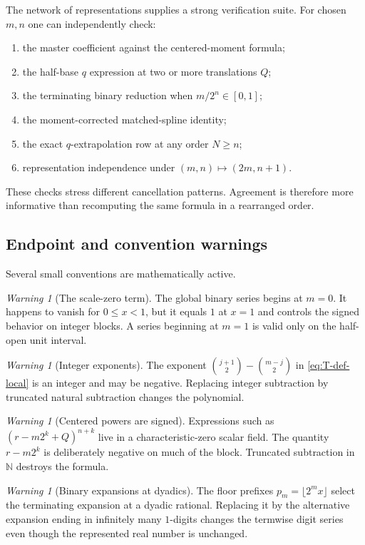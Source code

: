 \documentclass[11pt,oneside]{article}
\theoremstyle{definition}
\theoremstyle{remark}
\newtheorem{warning}[theorem]{Warning}
\newcommand{\N}{\mathbb N}
\begin{document}
The network of representations supplies a strong verification suite.  For chosen $m,n$ one
can independently check:
\begin{enumerate}
\item the master coefficient against the centered-moment formula;
\item the half-base $q$ expression at two or more translations $Q$;
\item the terminating binary reduction when $m/2^n\in[0,1]$;
\item the moment-corrected matched-spline identity;
\item the exact $q$-extrapolation row at any order $N\ge n$;
\item representation independence under $(m,n)\mapsto(2m,n+1)$.
\end{enumerate}
These checks stress different cancellation patterns.  Agreement is therefore more informative
than recomputing the same formula in a rearranged order.

\subsection{Endpoint and convention warnings}

Several small conventions are mathematically active.

\begin{warning}[The scale-zero term]
The global binary series begins at $m=0$.  It happens to vanish for $0\le x<1$, but it equals
$1$ at $x=1$ and controls the signed behavior on integer blocks.  A series beginning at
$m=1$ is valid only on the half-open unit interval.
\end{warning}

\begin{warning}[Integer exponents]
The exponent
$\binom{j+1}{2}-\binom{m-j}{2}$ in \eqref{eq:T-def-local} is an integer and may be negative.
Replacing integer subtraction by truncated natural subtraction changes the polynomial.
\end{warning}

\begin{warning}[Centered powers are signed]
Expressions such as $(r-m2^k+Q)^{n+k}$ live in a characteristic-zero scalar field.  The
quantity $r-m2^k$ is deliberately negative on much of the block.  Truncated subtraction in
$\N$ destroys the formula.
\end{warning}

\begin{warning}[Binary expansions at dyadics]
The floor prefixes $p_m=\lfloor2^mx\rfloor$ select the terminating expansion at a dyadic
rational.  Replacing it by the alternative expansion ending in infinitely many $1$-digits
changes the termwise digit series even though the represented real number is unchanged.
\end{warning}
\end{document}
